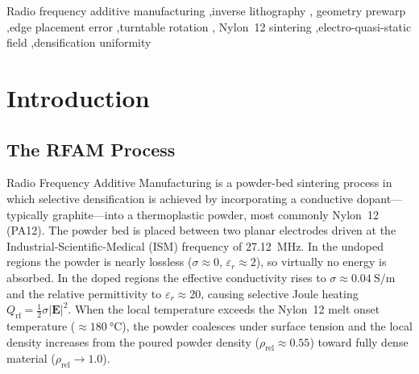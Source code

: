 \documentclass[5p,times]{elsarticle}
\newcommand{\Qrf}{Q_{\mathrm{rf}}}
\newcommand{\bndstd}{\sigma_{\mathrm{bnd}}}
\newcommand{\rhorel}{\rho_{\mathrm{rel}}}
\newcommand{\vect}[1]{\boldsymbol{#1}}
\newcommand{\half}{\tfrac{1}{2}}
\begin{document}
\begin{frontmatter}
\begin{abstract}
All three strategies are evaluated on a library of 17 primitive shapes
and in depth on a non-symmetric H-shape target.  The EPE prewarp
reduces geometric boundary RMSE from \SI{0.68}{\milli\meter} to
\SI{0.22}{\milli\meter} for the H-shape in two iterations.  Four $90^\circ$
turntable rotations over the six-minute exposure cycle reduce boundary
density standard deviation by 34\% on the bare H-shape and by 86\%
when combined with prewarp (from $\bndstd = 0.078$ to $0.011$).  The
combined approach achieves a minimum-to-maximum boundary density ratio
of 0.938, representing a factor-of-six reduction in boundary density
non-uniformity compared to the uncompensated baseline.  Spike assist
features provide only modest improvement ($\leq 14\%$ in $\bndstd$)
at geometrically impractical spike heights, limiting their practical
utility.  The synergy between prewarp and turntable rotation exceeds
their independent contributions by 24 percentage points, owing to a
structural interaction between the geometry correction and the exposure
averaging mechanism.
\end{abstract}

\begin{keyword}
Radio frequency additive manufacturing \sep inverse lithography \sep
geometry prewarp \sep edge placement error \sep turntable rotation \sep
Nylon~12 sintering \sep electro-quasi-static field \sep densification
uniformity
\end{keyword}

\end{frontmatter}

\section{Introduction}
\label{sec:introduction}

\subsection{The RFAM Process}

Radio Frequency Additive Manufacturing is a powder-bed sintering
process in which selective densification is achieved by incorporating
a conductive dopant---typically graphite---into a thermoplastic powder,
most commonly Nylon~12 (PA12).  The powder bed is placed between two
planar electrodes driven at the Industrial-Scientific-Medical (ISM)
frequency of \SI{27.12}{\mega\hertz}.  In the undoped regions the
powder is nearly lossless ($\sigma \approx 0$, $\varepsilon_r \approx
2$), so virtually no energy is absorbed.  In the doped regions the
effective conductivity rises to $\sigma \approx \SI{0.04}{\siemens\per\meter}$
and the relative permittivity to $\varepsilon_r \approx 20$, causing
selective Joule heating $\Qrf = \half\sigma|\vect{E}|^{2}$.  When the
local temperature exceeds the Nylon~12 melt onset temperature
($\approx\SI{180}{\celsius}$), the powder coalesces under surface
tension and the local density increases from the poured powder density
($\rhorel \approx 0.55$) toward fully dense material ($\rhorel \to
1.0$).
\end{document}
